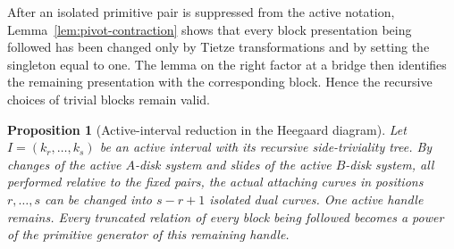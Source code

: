 \documentclass{article}
\newtheorem{prop}[theorem]{Proposition}
\begin{document}
After an isolated primitive pair is suppressed from the active notation,
Lemma~\ref{lem:pivot-contraction} shows that every block presentation being
followed has been changed only by Tietze transformations and by setting the
singleton equal to one.  The lemma on the right factor at a bridge then
identifies the remaining presentation with the corresponding block.  Hence
the recursive choices of trivial blocks remain valid.

\begin{prop}[Active-interval reduction in the Heegaard diagram]
\label{prop:open-active-interval-reduction}
Let $I=(k_r,\ldots,k_s)$ be an active interval with its recursive
side-triviality tree.  By changes of the active $A$-disk system and slides of
the active $B$-disk system, all performed relative to the fixed pairs, the
actual attaching curves in positions $r,\ldots,s$ can be changed into
$s-r+1$ isolated dual curves.  One active handle remains.  Every truncated
relation of every block being followed becomes a power of the primitive
generator of this remaining handle.
\end{prop}
\end{document}
